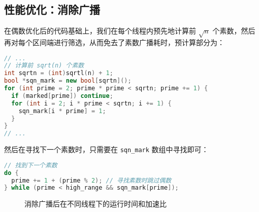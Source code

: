 \documentclass[11pt]{article}
\begin{document}
  \subsection{性能优化：消除广播}
  在偶数优化后的代码基础上，我们在每个线程内预先地计算前 $\sqrt{n}$ 个素数，然后再对每个区间端进行筛选，从而免去了素数广播耗时，预计算部分为：
  \begin{file}
    \begin{lstlisting}[language=C++]
// ...
// 计算前 sqrt(n) 个素数
int sqrtn = (int)sqrtl(n) + 1;
bool *sqn_mark = new bool[sqrtn]();
for (int prime = 2; prime * prime < sqrtn; prime += 1) {
  if (marked[prime]) continue;
  for (int i = 2; i * prime < sqrtn; i += 1) {
    sqn_mark[i * prime] = 1;
  }
}
// ...
    \end{lstlisting}
  \end{file}
  然后在寻找下一个素数时，只需要在 \verb|sqn_mark| 数组中寻找即可：
  \begin{file}
    \begin{lstlisting}[language=C++]
// 找到下一个素数
do {
  prime += 1 + (prime % 2); // 寻找素数时跳过偶数
} while (prime < high_range && sqn_mark[prime]);
    \end{lstlisting}
  \end{file}
  \begin{figure}[h]
    \centering
    \label{fig:no_cast}
    \caption{消除广播后在不同线程下的运行时间和加速比}
  \end{figure}
\end{document}
